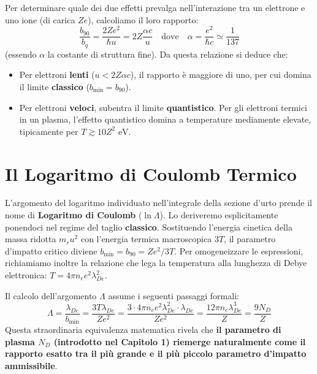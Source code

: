 Per determinare quale dei due effetti prevalga nell'interazione tra un elettrone e uno ione (di carica $Ze$), calcoliamo il loro rapporto:
\begin{equation}
\frac{b_{90}}{b_q} = \frac{2 Z e^2}{\hbar u} = 2 Z \frac{\alpha c}{u} \quad \text{dove} \quad \alpha = \frac{e^2}{\hbar c} \simeq \frac{1}{137}
\end{equation}
(essendo $\alpha$ la costante di struttura fine).
Da questa relazione si deduce che:
\begin{itemize}
\item Per elettroni \textbf{lenti} ($u < 2 Z \alpha c$), il rapporto è maggiore di uno, per cui domina il limite \textbf{classico} ($b_{\text{min}} = b_{90}$).
\item Per elettroni \textbf{veloci}, subentra il limite \textbf{quantistico}. Per gli elettroni termici in un plasma, l'effetto quantistico domina a temperature mediamente elevate, tipicamente per $T \gtrsim 10 Z^2 \text{ eV}$.
\end{itemize}

\section{Il Logaritmo di Coulomb Termico}

L'argomento del logaritmo individuato nell'integrale della sezione d'urto prende il nome di \textbf{Logaritmo di Coulomb} ($\ln \Lambda$). Lo deriveremo esplicitamente ponendoci nel regime del taglio \textbf{classico}.
Sostituendo l'energia cinetica della massa ridotta $m_r u^2$ con l'energia termica macroscopica $3T$, il parametro d'impatto critico diviene $b_{\text{min}} = b_{90} = Z e^2 / 3T$. Per omogeneizzare le espressioni, richiamiamo inoltre la relazione che lega la temperatura alla lunghezza di Debye elettronica: $T = 4\pi n_e e^2 \lambda_{De}^2$.

Il calcolo dell'argomento $\Lambda$ assume i seguenti passaggi formali:
\begin{equation}
\Lambda = \frac{\lambda_{De}}{b_{\text{min}}} = \frac{3 T \lambda_{De}}{Z e^2} = \frac{3 \cdot 4\pi n_e e^2 \lambda_{De}^2 \cdot \lambda_{De}}{Z e^2} = \frac{12\pi n_e \lambda_{De}^3}{Z} = \frac{9 N_D}{Z}
\end{equation}
Questa straordinaria equivalenza matematica rivela che \textbf{il parametro di plasma $N_D$ (introdotto nel Capitolo 1) riemerge naturalmente come il rapporto esatto tra il più grande e il più piccolo parametro d'impatto ammissibile}.

